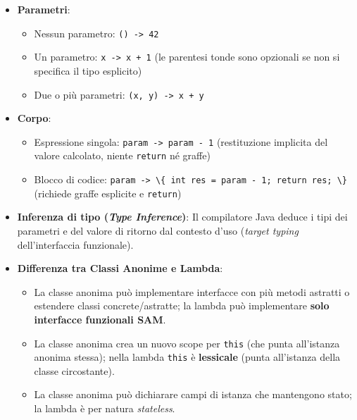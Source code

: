 \documentclass[11pt,a4paper]{article}
\newcommand{\passthrough}[1]{#1}
\providecommand{\tightlist}{\setlength{\itemsep}{0pt}\setlength{\parskip}{0pt}}
\begin{document}
\begin{itemize}
\tightlist
\item
  \textbf{Parametri}:

  \begin{itemize}
  \tightlist
  \item
    Nessun parametro: \passthrough{\lstinline!() -> 42!}
  \item
    Un parametro: \passthrough{\lstinline!x -> x + 1!} (le parentesi
    tonde sono opzionali se non si specifica il tipo esplicito)
  \item
    Due o più parametri: \passthrough{\lstinline!(x, y) -> x + y!}
  \end{itemize}
\item
  \textbf{Corpo}:

  \begin{itemize}
  \tightlist
  \item
    Espressione singola: \passthrough{\lstinline!param -> param - 1!}
    (restituzione implicita del valore calcolato, niente
    \passthrough{\lstinline!return!} né graffe)
  \item
    Blocco di codice:
    \passthrough{\lstinline!param -> \{ int res = param - 1; return res; \}!}
    (richiede graffe esplicite e \passthrough{\lstinline!return!})
  \end{itemize}
\item
  \textbf{Inferenza di tipo (\emph{Type Inference})}: Il compilatore
  Java deduce i tipi dei parametri e del valore di ritorno dal contesto
  d'uso (\emph{target typing} dell'interfaccia funzionale).
\item
  \textbf{Differenza tra Classi Anonime e Lambda}:

  \begin{itemize}
  \tightlist
  \item
    La classe anonima può implementare interfacce con più metodi
    astratti o estendere classi concrete/astratte; la lambda può
    implementare \textbf{solo interfacce funzionali SAM}.
  \item
    La classe anonima crea un nuovo scope per
    \passthrough{\lstinline!this!} (che punta all'istanza anonima
    stessa); nella lambda \passthrough{\lstinline!this!} è
    \textbf{lessicale} (punta all'istanza della classe circostante).
  \item
    La classe anonima può dichiarare campi di istanza che mantengono
    stato; la lambda è per natura \emph{stateless}.
  \end{itemize}
\end{itemize}
\end{document}
